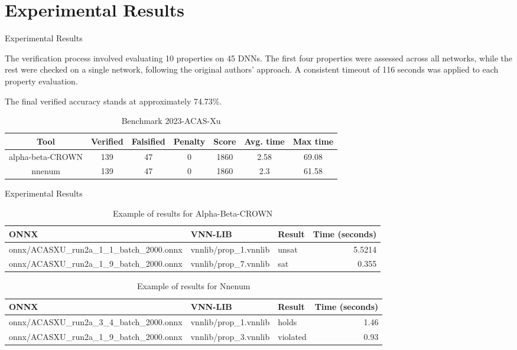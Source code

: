 \documentclass[9pt]{beamer}
\begin{document}
\section{Experimental Results}
\begin{frame}{Experimental Results}

The verification process involved evaluating 10 properties on 45 DNNs. The first four properties were assessed across all networks, while the rest were checked on a single network, following the original authors' approach. A consistent timeout of 116 seconds was applied to each property evaluation.

\vspace{0.6cm}

The final verified accuracy stands at approximately 74.73\%.

\begin{table}[h!]
\centering
\footnotesize
\begin{tabular}{ccccccc}
\toprule
Tool & Verified & Falsified & Penalty & Score & Avg. time & Max time \\
\midrule
alpha-beta-CROWN & 139 & 47 & 0 & 1860 & 2.58 & 69.08 \\
nnenum & 139 & 47 & 0 & 1860 & 2.3 & 61.58 \\
\bottomrule
\end{tabular}
\caption{Benchmark 2023-ACAS-Xu}
\label{table:res1}
\end{table}
\end{frame}

\begin{frame}{Experimental Results}

\begin{table}[h!]
\centering
\footnotesize
\begin{tabular}{lllr}
\toprule
ONNX & VNN-LIB & Result & Time (seconds) \\
\midrule
onnx/ACASXU\_run2a\_1\_1\_batch\_2000.onnx & vnnlib/prop\_1.vnnlib & unsat & 5.5214 \\
onnx/ACASXU\_run2a\_1\_9\_batch\_2000.onnx & vnnlib/prop\_7.vnnlib & sat & 0.355 \\
\bottomrule
\end{tabular}
\caption{Example of results for Alpha-Beta-CROWN}
\label{table:ex_nnenum_abc}
\end{table}

\begin{table}[h!]
\centering
\footnotesize
\begin{tabular}{lllr}
\toprule
ONNX & VNN-LIB & Result & Time (seconds) \\
\midrule
onnx/ACASXU\_run2a\_3\_4\_batch\_2000.onnx & vnnlib/prop\_1.vnnlib & holds & 1.46 \\
onnx/ACASXU\_run2a\_1\_9\_batch\_2000.onnx & vnnlib/prop\_3.vnnlib & violated & 0.93 \\
\bottomrule
\end{tabular}
\caption{Example of results for Nnenum}
\label{table:ex_nnenum}
\end{table}
\end{frame}
\end{document}
